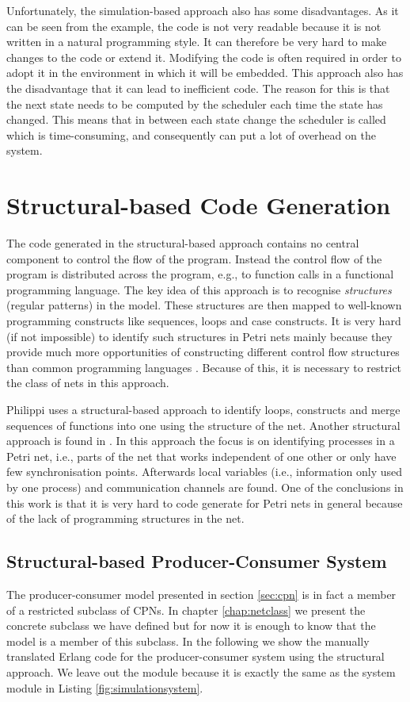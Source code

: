 Unfortunately, the simulation-based approach also has some disadvantages. As it can be seen from the example, the code is not very readable because it is not written in a natural programming style. It can therefore be very hard to make changes to the code or extend it. Modifying the code is often required in order to adopt it in the environment in which it will be embedded. This approach also has the disadvantage that it can lead to inefficient code. The reason for this is that the next state needs to be computed by the scheduler each time the state has changed. This means that in between each state change the scheduler is called which is time-consuming, and consequently can put a lot of overhead on the system.

\section{Structural-based Code Generation}
\label{sec:structuralcodegeneration}
The code generated in the structural-based approach contains no central component to control the flow of the program. Instead the control flow of the program is distributed across the program, e.g., to function calls in a functional programming language. The key idea of this approach is to recognise \emph{structures} (regular patterns) in the model. These structures are then mapped to well-known programming constructs like sequences, loops and case constructs. It is very hard (if not impossible) to identify such structures in Petri nets mainly because they provide much more opportunities of constructing different control flow structures than common programming languages \cite{RefWorks:4}. Because of this, it is necessary to restrict the class of nets in this approach. 

Philippi \cite{RefWorks:4} uses a structural-based approach to identify loops,  constructs and merge sequences of functions into one using the structure of the net. Another structural approach is found in \cite{RefWorks:5}. In this approach the focus is on identifying processes in a Petri net, i.e., parts of the net that works independent of one other or only have few synchronisation points. Afterwards local variables (i.e., information only used by one process) and communication channels are found. One of the conclusions in this work is that it is very hard to code generate for Petri nets in general because of the lack of programming structures in the net.

\subsection{Structural-based Producer-Consumer System}
The producer-consumer model presented in section \ref{sec:cpn} is in fact a member of a restricted subclass of CPNs. In chapter \ref{chap:netclass} we present the concrete subclass we have defined but for now it is enough to know that the model is a member of this subclass. In the following we show the manually translated Erlang code for the producer-consumer system using the structural approach. We leave out the  module because it is exactly the same as the system module in Listing \ref{fig:simulationsystem}. 

